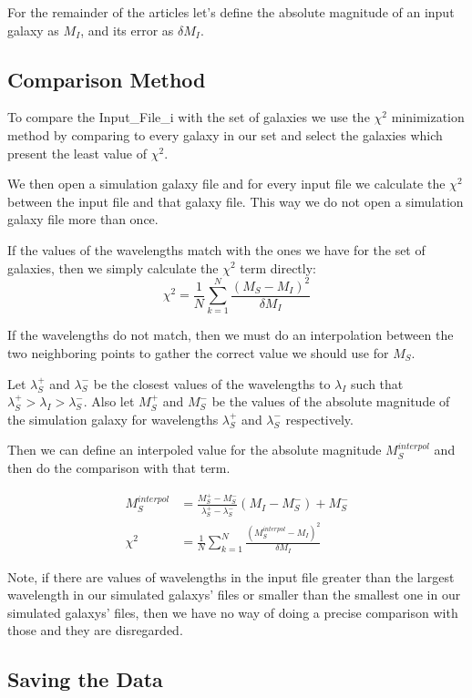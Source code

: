 \documentclass[11pt]{article}
\begin{document}
For the remainder of the articles let's define the absolute magnitude of an input galaxy as $M_{I}$, and its error as $\delta M_I$.

\subsection{Comparison Method}
To compare the Input\_File\_i with the set of galaxies we use the $\chi^2$ minimization method by comparing to every galaxy in our set and select the galaxies which present the least value of $\chi^2$.

We then open a simulation galaxy file and for every input file we calculate the $\chi^2$ between the input file and that galaxy file. This way we do not open a simulation galaxy file more than once.

If the values of the wavelengths match with the ones we have for the set of galaxies, then we simply calculate the $\chi^2$ term directly:
\begin{equation}
\chi^2 = \frac{1}{N}\sum_{k=1}^N \frac{(M_S - M_I)^2}{\delta M_I}
\end{equation}

If the wavelengths do not match, then we must do an interpolation between the two neighboring points to gather the correct value we should use for $M_S$. 

Let $\lambda_S^+$ and $\lambda_S^-$ be the closest values of the wavelengths to $\lambda_I$ such that $\lambda_S^+ > \lambda_I > \lambda_S^-$.  Also let $M_S^+$ and $M_S^-$ be the values of the absolute magnitude of the simulation galaxy for wavelengths $\lambda_S^+$ and $\lambda_S^-$ respectively.

Then we can define an interpoled value for the absolute magnitude $M_S^{interpol}$ and then do the comparison with that term.

\begin{align}
M_S^{interpol} &= \frac{M_S^+ - M_S^-}{\lambda_S^+ - \lambda_S^-} (M_I - M_S^-) + M_S^-\\
\chi^2 &= \frac{1}{N} \sum_{k=1}^N \frac{ (M_S^{interpol} - M_I)^2}{\delta M_I}
\end{align}

Note, if there are values of wavelengths in the input file greater than the largest wavelength in our simulated galaxys' files or smaller than the smallest one in our simulated galaxys' files, then we have no way of doing a precise comparison with those and they are disregarded.

\subsection{Saving the Data}
\end{document}
